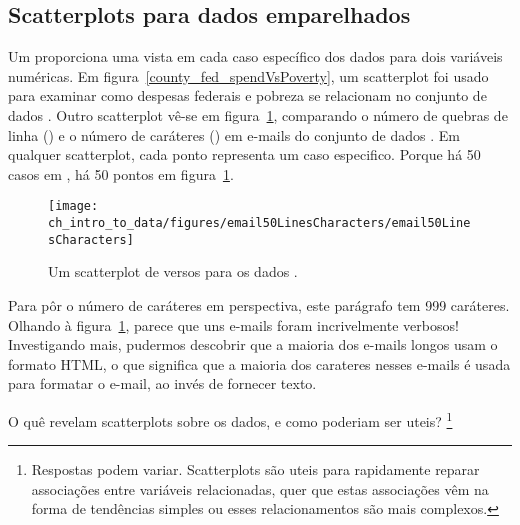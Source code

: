 \subsection{Scatterplots para dados emparelhados}
\label{scatterPlots}


Um  proporciona uma vista em cada caso específico dos dados para dois variáveis numéricas.
Em figura~\vref{county_fed_spendVsPoverty}, um scatterplot foi usado para examinar como despesas federais e pobreza se relacionam no conjunto de dados .
Outro scatterplot vê-se em figura~\ref{email50LinesCharacters}, comparando o número de quebras de linha () e o número de caráteres () em e-mails do conjunto de dados .
Em qualquer scatterplot, cada ponto representa um caso especifico.
Porque há 50 casos em , há 50 pontos em figura~\ref{email50LinesCharacters}.

\textC{\setlength{\captionwidth}{0.9\textwidth}}

\begin{figure}[h]
   \centering
   \texttt{[image: ch\_intro\_to\_data/figures/email50LinesCharacters/email50LinesCharacters]}
   \caption{Um scatterplot de  versos  para os dados .}
   \label{email50LinesCharacters}
\end{figure}

\textC{\setlength{\captionwidth}{\mycaptionwidth}}

Para pôr o número de caráteres em perspectiva, este parágrafo tem 999 caráteres.
Olhando à figura~\ref{email50LinesCharacters}, parece que uns e-mails foram incrivelmente verbosos!
Investigando mais, pudermos descobrir que a maioria dos e-mails longos usam o formato HTML, o que significa que a maioria dos carateres nesses e-mails é usada para formatar o e-mail, ao invés de fornecer texto.

\begin{exercise}
 O quê revelam scatterplots sobre os dados, e como poderiam ser uteis?
 \footnote{
  Respostas podem variar.
  Scatterplots são uteis para rapidamente reparar associações entre variáveis relacionadas, quer que estas associações vêm na forma de tendências simples ou esses relacionamentos são mais complexos.
 }
\end{exercise}

